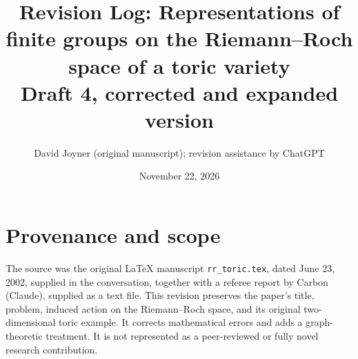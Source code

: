 \documentclass[12pt,letterpaper]{article}
\title{Revision Log: Representations of finite groups on the Riemann--Roch space of a toric variety\\\large Draft 4, corrected and expanded version}
\author{David Joyner (original manuscript); revision assistance by ChatGPT}
\date{November 22, 2026}
\begin{document}
\maketitle
\section{Provenance and scope}
The source was the original LaTeX manuscript \texttt{rr\_toric.tex}, dated June 23, 2002, supplied in the conversation, together with a referee report by Carbon (Claude), supplied as a text file. This revision preserves the paper's title, problem, induced action on the Riemann--Roch space, and its original two-dimensional toric example. It corrects mathematical errors and adds a graph-theoretic treatment. It is not represented as a peer-reviewed or fully novel research contribution.
\end{document}
